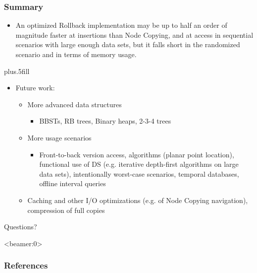 \documentclass{beamer}
\begin{document}
\begin{frame}
\frametitle<presentation>{Summary}

\begin{itemize}

  \item An optimized Rollback implementation may be up to half an order of
  magnitude faster at insertions than Node Copying, and at access in sequential
  scenarios with large enough data sets, but it falls short in the randomized
  scenario and in terms of memory usage.

\end{itemize}

\pause

\vskip0pt plus.5fill
\begin{itemize}
  \item Future work:
  \begin{itemize}

    \item More advanced data structures

    \begin{itemize}

      \item BBSTs, RB trees, Binary heaps, 2-3-4 trees

    \end{itemize}

\pause
    \item More usage scenarios

    \begin{itemize}

      \item Front-to-back version access, algorithms (planar point location),
      functional use of DS (e.g. iterative depth-first algorithms on large data
      sets), intentionally worst-case scenarios, temporal databases, offline
      interval queries

    \end{itemize}

\pause
    \item Caching and other I/O optimizations (e.g. of Node Copying navigation),
    compression of full copies

  \end{itemize}
\end{itemize}
\end{frame}

\bgroup
{}
\begin{frame}[plain]{}
\center
\Huge
Questions?
\end{frame}
\egroup

\begin{frame}<beamer:0>
\frametitle{References}


\end{frame}
\end{document}
